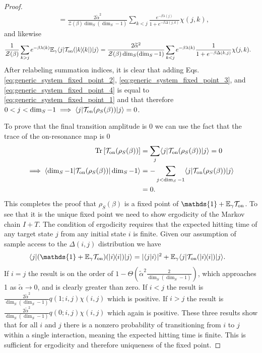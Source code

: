 \documentclass{article}
\newcommand{\on}{\rm on}
\newcommand{\ket}[1]{|#1\rangle}
\newcommand{\bra}[1]{\langle #1|}
\newcommand{\braket}[2]{\langle #1|#2\rangle}
\newcommand{\ketbra}[2]{| #1\rangle\! \langle #2|}
\newcommand{\brackets}[1]{\left[ #1 \right]}
\DeclareMathOperator{\Tr}{Tr}
\newcommand{\trace}[1]{\Tr \brackets{ #1 }}
\newcommand{\partfun}{\mathcal{Z}}
\newcommand{\identity}{\mathds{1}}
\begin{document}
\begin{proof}
\begin{align}
    &= \frac{2 \widetilde{\alpha}^2 }{\partfun(\beta) \dim_S(\dim_S - 1) } \sum_{k < j} \frac{e^{-\beta \lambda(j)}}{1 + e^{-\beta \Delta(j, k)}} \chi(j, k), \label{eq:generic_system_fixed_point_3}
\end{align}
and likewise
\begin{align}
    \frac{1}{\partfun(\beta)} \sum_{k > j} e^{-\beta \lambda(k)} \mathbb{E}_{\gamma} \bra{j} \mathcal{T}_{\on}(\ketbra{k}{k}) \ket{j} &= \frac{2 \widetilde{\alpha}^2 }{\partfun(\beta) \dim_S(\dim_S - 1) } \sum_{k < j} e^{-\beta \lambda(k)} \frac{1}{1 + e^{-\beta \Delta(k, j)}} \chi(j, k). \label{eq:generic_system_fixed_point_4}
\end{align}
After relabeling summation indices, it is clear that adding Eqs. \eqref{eq:generic_system_fixed_point_2}, \eqref{eq:generic_system_fixed_point_3}, and \eqref{eq:generic_system_fixed_point_4} is equal to \eqref{eq:generic_system_fixed_point_1} and that therefore $0 < j < \dim_S - 1 \implies \bra{j} \mathcal{T}_{\on}(\rho_S(\beta)) \ket{j} = 0$.

To prove that the final transition amplitude is 0 we can use the fact that the trace of the on-resonance map is 0
\begin{align}
    \trace{\mathcal{T}_{\on}(\rho_S(\beta))} &= \sum_j \bra{j} \mathcal{T}_{\on}(\rho_S(\beta)) \ket{j} = 0\\
    \implies \bra{\dim_S - 1} \mathcal{T}_{\on}(\rho_S(\beta)) \ket{\dim_S - 1} &= - \sum_{j < \dim_S - 1} \bra{j} \mathcal{T}_{\on}(\rho_S(\beta)) \ket{j} \\ 
    &= 0.
\end{align}
This completes the proof that $\rho_S(\beta)$ is a fixed point of $\identity + \mathbb{E}_{\gamma} \mathcal{T}_{\on}$. To see that it is the unique fixed point we need to show ergodicity of the Markov chain $I + T$. The condition of ergodicity requires that the expected hitting time of any target state $j$ from any initial state $i$ is finite. Given our assumption of sample access to the $\Delta(i,j)$ distribution we have 
\begin{align}
    \bra{j} (\identity + \mathbb{E}_{\gamma} \mathcal{T}_{\on})(\ketbra{i}{i}) \ket{j} &= |\braket{j}{i}|^2 + \mathbb{E}_{\gamma} \bra{j} \mathcal{T}_{\on} (\ketbra{i}{i}) \ket{j}.
\end{align}
If $i = j$ the result is on the order of $1 - \Theta(\widetilde{\alpha}^2 \frac{2}{\dim_S (\dim_S - 1)})$, which approaches 1 as $\widetilde{\alpha} \to 0$, and is clearly greater than zero. If $i < j$ the result is $\frac{2 \widetilde{\alpha}^2}{\dim_S (\dim_S - 1)} q(1; i,j) \chi(i,j)$ which is positive. If $i > j$ the result is $\frac{2 \widetilde{\alpha}^2}{\dim_S (\dim_S - 1)} q(0; i,j) \chi(i,j)$ which again is positive. These three results show that for all $i$ and $j$ there is a nonzero probability of transitioning from $i$ to $j$ within a single interaction, meaning the expected hitting time is finite. This is sufficient for ergodicity and therefore uniqueness of the fixed point.


\end{proof}
\end{document}

